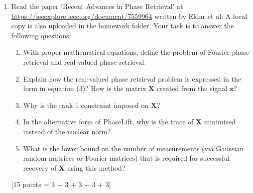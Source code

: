 \documentclass[11pt]{article}
\begin{document}
\begin{enumerate}
\item Read the paper `Recent Advances in Phase Retrieval' at \url{https://ieeexplore.ieee.org/document/7559964} written by Eldar et al. A local copy is also uploaded in the homework folder. Your task is to answer the following questions:
\begin{enumerate}
\item With proper mathematical equations, define the problem of Fourier phase retrieval and real-valued phase retrieval.
\item Explain how the real-valued phase retrieval problem is expressed in the form in equation (3)? How is the matrix $\boldsymbol{X}$ created from the signal $\boldsymbol{x}$? 
\item Why is the rank 1 constraint imposed on $\boldsymbol{X}$?
\item In the alternative form of PhaseLift, why is the trace of $\boldsymbol{X}$ minimized instead of the nuclear norm? 
\item What is the lower bound on the number of measurements (via Gaussian random matrices or Fourier matrices) that is required for successful recovery of $\boldsymbol{X}$ using this method? 
\end{enumerate} \textsf{[15 points = 3 + 3 + 3 + 3 + 3]}

\end{enumerate}
\end{document}
